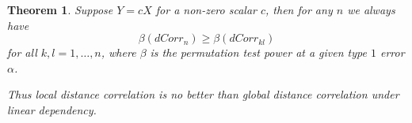 \documentclass[12pt]{article}
\newtheorem{thm}{Theorem}
\begin{document}

\begin{thm}
\label{thm2}
Suppose $Y=cX$ for a non-zero scalar $c$, then for any $n$ we always have
\begin{equation}
\label{equ1}
\beta(dCorr_{n}) \geq \beta(dCorr_{kl})
\end{equation}
for all $k,l=1,\ldots,n$, where $\beta$ is the permutation test power at a given type $1$ error $\alpha$.

Thus local distance correlation is no better than global distance correlation under linear dependency.
\end{thm}
\end{document}
